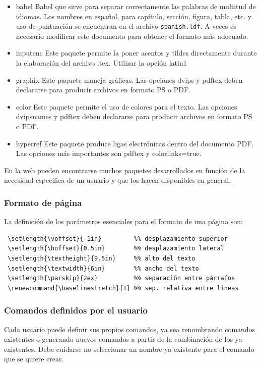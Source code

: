 \documentclass[12pt]{report}
\renewcommand{\baselinestretch}{1}
\begin{document}
\begin{itemize}
\item {\sf babel} Babel que sirve para separar correctamente las palabras de multitud de idiomas. Los nombres en español, para capítulo, sección, figura, tabla, etc. y uso de puntuación se encuentran en el archivo \verb|spanish.ldf|. A veces es necesario modificar este documento para obtener el formato más adecuado.
\item {\sf inputenc} Este paquete permite la poner acentos y tildes directamente durante la elaboración del archivo {\sf .tex}. Utilizar la opción {\sf latin1} 
\item {\sf graphix} Este paquete maneja gráficas. Las opciones {\sf dvips} y {\sf pdftex} deben declararse para producir archivos en formato PS o PDF.
\item {\sf color} Este paquete permite el uso de colores para el texto. Las opciones {\sf dvipsnames} y {\sf pdftex} deben declararse para producir archivos en formato PS o PDF.
\item {\sf hyperref} Este paquete produce ligas electrónicas dentro del documento PDF. Las opciones más importantes son {\sf pdftex} y {\sf colorlinks=true}.
\end{itemize}

En la web pueden encontrarse muchos paquetes desarrollados en función de la necesidad específica de un usuario y que los hacen disponibles en general.

\subsubsection*{Formato de página}
La definición de los parámetros esenciales para el formato de una página son:

\begin{verbatim}
 \setlength{\voffset}{-1in}         %% desplazamiento superior
 \setlength{\hoffset}{0.5in}        %% desplazamiento lateral
 \setlength{\textheight}{9.5in}     %% alto del texto
 \setlength{\textwidth}{6in}        %% ancho del texto
 \setlength{\parskip}{2ex}          %% separación entre párrafos
 \renewcommand{\baselinestretch}{1} %% sep. relativa entre líneas 
\end{verbatim}

\subsubsection{Comandos definidos por el usuario}

\noindent Cada usuario puede definir sus propios comandos, ya sea renombrando comandos existentes o generando nuevos comandos a partir de la combinación de los ya existentes. Debe cuidarse no seleccionar un nombre ya existente para el comando que se quiere crear.
\end{document}
